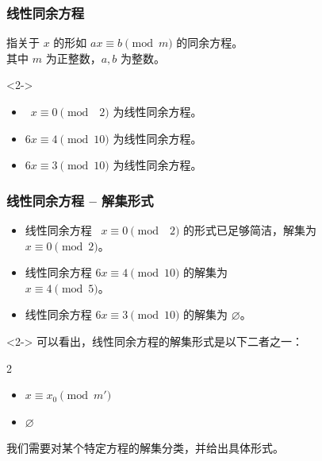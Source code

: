 \documentclass{../pkslide}
\begin{document}
\begin{frame}
  \frametitle{线性同余方程}
  \begin{definition}
    指关于 $x$ 的形如 $a x \equiv b \pmod{m}$ 的同余方程。\\
    其中 $m$ 为正整数，$a, b$ 为整数。
  \end{definition}
  
  \begin{uncoverenv}<2->
    \begin{examples}[线性同余方程]
      \begin{itemize}
        \item $\phantom{1}x \equiv 0 \pmod{\phantom{0}2}$ 为线性同余方程。
        \item $6 x \equiv 4 \pmod{10}$ 为线性同余方程。
        \item $6 x \equiv 3 \pmod{10}$ 为线性同余方程。
      \end{itemize}
    \end{examples}
  \end{uncoverenv}
\end{frame}

\begin{frame}
  \frametitle{线性同余方程 -- 解集形式}
  \begin{examples}[线性同余方程的解集]
    \begin{itemize}
      \item 线性同余方程 $\phantom{1}x \equiv 0 \pmod{\phantom{0}2}$ 的形式已足够简洁，解集为\\
        \-\hspace{2em}$x \equiv 0 \pmod{2}$。
      \item 线性同余方程 $6 x \equiv 4 \pmod{10}$ 的解集为\\
        \-\hspace{2em}$x \equiv 4 \pmod{5}$。
      \item 线性同余方程 $6 x \equiv 3 \pmod{10}$ 的解集为 $\varnothing$。
    \end{itemize}
  \end{examples}
  
  \begin{uncoverenv}<2->
    可以看出，线性同余方程的解集形式是以下二者之一：
    
    \begin{mymulticols}[l][l]{2}
      \begin{itemize}
        \item $x \equiv x_0 \pmod{m'}$
        \item $\varnothing$
      \end{itemize}
    \end{mymulticols}

    \emptyline
    
    我们需要对某个特定方程的解集分类，并给出具体形式。
  \end{uncoverenv}
\end{frame}
\end{document}

